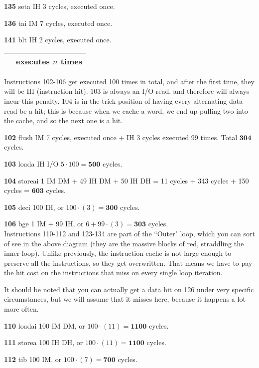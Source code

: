 \documentclass[a4paper]{article}
\begin{document}
\textbf{135} seta IH 3 cycles, executed once.

\textbf{136} tai IM 7 cycles, executed once.

\textbf{141} blt IH 2 cycles, executed once. \\

\begin{tabular}{|c|c|}
\hline
\cellcolor{red} & executes $n$ times \\
\hline
\end{tabular}

Instructions 102-106 get executed 100 times in total, and after the first time, they will be IH (instruction hit). 103 is always an I/O read, and therefore will always incur this penalty. 104 is in the trick position of having every alternating data read be a hit; this is because when we cache a word, we end up pulling two into the cache, and so the next one is a hit.

\textbf{102} flush IM 7 cycles, executed once + IH 3 cycles executed 99 times. Total $\mathbf{304}$ cycles.

\textbf{103} loada IH I/O $5 \cdot 100  = \mathbf{500}$ cycles.

\textbf{104} storeai 1 IM DM + 49 IH DM + 50 IH DH = 11 cycles + 343 cycles + 150 cycles = $\mathbf{603}$ cycles.

\textbf{105} deci 100 IH, or $100 \cdot (3) = \mathbf{300}$ cycles.

\textbf{106} bge 1 IM + 99 IH, or $6 + 99 \cdot (3) = \mathbf{303}$ cycles. \\

Instructions 110-112 and 123-134 are part of the ``Outer" loop, which you can sort of see in the above diagram (they are the massive blocks of red, straddling the inner loop). Unlike previously, the instruction cache is not large enough to preserve all the instructions, so they get overwritten. That means we have to pay the hit cost on the instructions that miss on every single loop iteration.

It should be noted that you can actually get a data hit on 126 under very specific circumstances, but we will assume that it misses here, because it happens a lot more often.

\textbf{110} loadai 100 IM DM, or $100 \cdot (11) = \mathbf{1100}$ cycles.

\textbf{111} storea 100 IH DH, or $100 \cdot (11) = \mathbf{1100}$ cycles.

\textbf{112} tib 100 IM, or $100 \cdot (7) = \mathbf{700}$ cycles.
\end{document}
